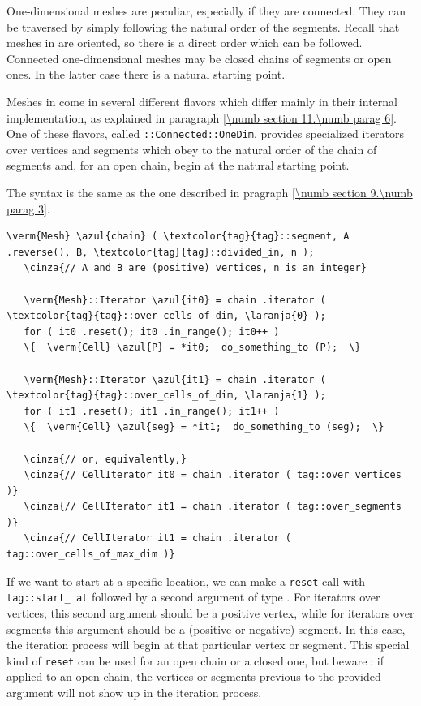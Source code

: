 One-dimensional meshes are peculiar, especially if they are connected.
They can be traversed by simply following the natural order of the segments.
Recall that meshes in {\maniFEM} are oriented, so there is a direct order which can be followed.
Connected one-dimensional meshes may be closed chains of segments or open ones.
In the latter case there is a natural starting point.

Meshes in {\maniFEM} come in several different flavors which differ mainly in their internal
implementation, as explained in paragraph \ref{\numb section 11.\numb parag 6}.
One of these flavors, called {\small\tt {}::Connected::OneDim}, provides specialized iterators
over vertices and segments which obey to the natural order of the chain of segments and,
for an open chain, begin at the natural starting point.

The syntax is the same as the one described in pragraph \ref{\numb section 9.\numb parag 3}.

\begin{Verbatim}[commandchars=\\\{\},formatcom=\small\tt,
   baselinestretch=0.94,framesep=2mm                      ]
   \verm{Mesh} \azul{chain} ( \textcolor{tag}{tag}::segment, A .reverse(), B, \textcolor{tag}{tag}::divided_in, n );
   \cinza{// A and B are (positive) vertices, n is an integer}
   
   \verm{Mesh}::Iterator \azul{it0} = chain .iterator ( \textcolor{tag}{tag}::over_cells_of_dim, \laranja{0} );
   for ( it0 .reset(); it0 .in_range(); it0++ )
   \{  \verm{Cell} \azul{P} = *it0;  do_something_to (P);  \}

   \verm{Mesh}::Iterator \azul{it1} = chain .iterator ( \textcolor{tag}{tag}::over_cells_of_dim, \laranja{1} );
   for ( it1 .reset(); it1 .in_range(); it1++ )
   \{  \verm{Cell} \azul{seg} = *it1;  do_something_to (seg);  \}
   
   \cinza{// or, equivalently,}
   \cinza{// CellIterator it0 = chain .iterator ( tag::over_vertices )}
   \cinza{// CellIterator it1 = chain .iterator ( tag::over_segments )}
   \cinza{// CellIterator it1 = chain .iterator ( tag::over_cells_of_max_dim )}
\end{Verbatim}

If we want to start at a specific location, we can make a {\small\tt reset} call with
{\small\tt \textcolor{tag}{tag}::start\_\,at} followed by a second argument of type {\small\tt{}}.
For iterators over vertices, this second argument should be a positive vertex,
while for iterators over segments this argument should be a (positive or negative) segment.
In this case, the iteration process will begin at that particular vertex or segment.
This special kind of {\small\tt reset} can be used for an open chain or a closed one,
but beware$\;$: if applied to an open chain, the vertices or segments previous to the provided
argument will not show up in the iteration process.

